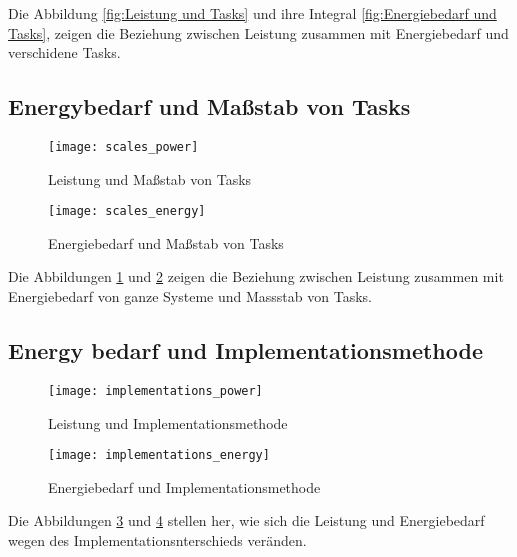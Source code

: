 Die Abbildung \ref{fig:Leistung und Tasks} und ihre Integral \ref{fig:Energiebedarf und Tasks}, zeigen die Beziehung zwischen Leistung zusammen mit Energiebedarf und verschidene Tasks.

\subsection{Energybedarf und Maßstab von Tasks}
\label{subsec:Energybedarf und Massstab von Tasks}

\begin{figure}[ht]
\texttt{[image: scales\_power]}
\caption[Leistung und Maßstab von Tasks]{Leistung und Maßstab von Tasks}
\label{fig:Leistung und Massstab von Tasks}
\end{figure}

\begin{figure}[ht]
\texttt{[image: scales\_energy]}
\caption[Energiebedarf und Maßstab von Tasks]{Energiebedarf und Maßstab von Tasks}
\label{fig:Energiebedarf und Massstab von Tasks}
\end{figure}

Die Abbildungen \ref{fig:Leistung und Massstab von Tasks} und \ref{fig:Energiebedarf und Massstab von Tasks} zeigen die Beziehung zwischen Leistung zusammen mit Energiebedarf von ganze Systeme und Massstab von Tasks.

\subsection{Energy bedarf und Implementationsmethode}
\label{subsec:Energy bedarf und Implementationsmethode}

\begin{figure}[ht]
\texttt{[image: implementations\_power]}
\caption[Leistung und Implementationsmethode]{Leistung und Implementationsmethode}
\label{fig:Leistung und Implementationsmethode}
\end{figure}

\begin{figure}[ht]
\texttt{[image: implementations\_energy]}
\caption[Energiebedarf und Implementationsmethode]{Energiebedarf und Implementationsmethode}
\label{fig:Energiebedarf und Implementationsmethode}
\end{figure}

Die Abbildungen \ref{fig:Leistung und Implementationsmethode} und \ref{fig:Energiebedarf und Implementationsmethode} stellen her, wie sich die Leistung und Energiebedarf wegen des Implementationsnterschieds veränden.
